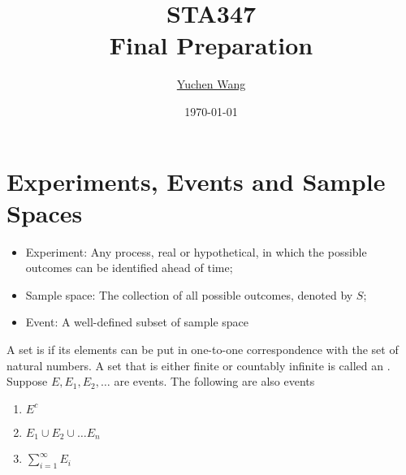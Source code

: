 \documentclass[11pt]{article}
\title{STA347 \\ Final Preparation}
\author{\textcolor{blue}{\href{https://www.yuchenwyc.com}{Yuchen Wang}}}
\date{\today}
\begin{document}
    \maketitle
    \tableofcontents
    \newpage
    \section{Experiments, Events and Sample Spaces}
    \begin{itemize}
    	\item Experiment: Any process, real or hypothetical, in which the possible outcomes can be identified ahead of time;
    	\item Sample space: The collection of all possible outcomes, denoted by $S$;
    	\item Event: A well-defined subset of sample space
    \end{itemize}
   A set is  if its elements can be put in one-to-one correspondence with the set of natural numbers.
   A set that is either finite or countably infinite is called an .
   \theorem
   Suppose $E, E_1, E_2, \hdots$ are events. The following are also events
   \begin{enumerate}
   	\item $E^c$
   	\item $E_1 \cup E_2 \cup \hdots E_n$
   	\item $\sum_{i=1}^\infty E_i$
   \end{enumerate}
\end{document}
